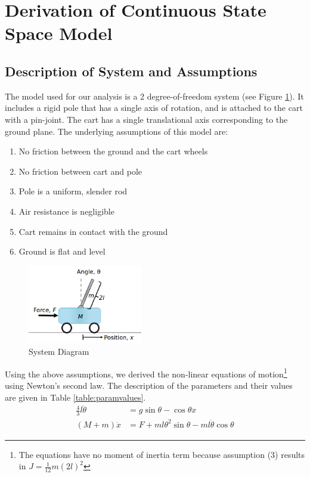 \documentclass{article}
\begin{document}
\section{Derivation of Continuous State Space Model}
\subsection{Description of System and Assumptions}
The model used for our analysis is a 2 degree-of-freedom system (see Figure \ref{fig:sys_diagram}). It includes a rigid pole that has a single axis of rotation, and is attached to the cart with a pin-joint. The cart has a single translational axis corresponding to the ground plane. The underlying assumptions of this model are:
\begin{multicols}{2}
\begin{enumerate}
\item No friction between the ground and the cart wheels
\item No friction between cart and pole
\item Pole is a uniform, slender rod
\item Air resistance is negligible
\item Cart remains in contact with the ground
\item Ground is flat and level
\end{enumerate}
\end{multicols}
\begin{figure}[h!]
 	\centering
 	\includegraphics[width=5cm,keepaspectratio]{SystemDiagram.png}
 	\caption{System Diagram}
 	\label{fig:sys_diagram}
 \end{figure}
Using the above assumptions, we derived the non-linear equations of motion\footnote{The equations have no moment of inertia term because assumption (3) results in $J=\frac{1}{12}m(2l)^2$} using Newton's second law.  The description of the parameters and their values are given in Table \ref{table:paramvalues}.
\begin{equation}
\begin{aligned}
\frac{4}{3}l \ddot{\theta} &= g \sin \theta - \cos \theta \ddot{x} \\
(M+m)\ddot{x} &= F + ml \theta^2 \sin\theta -ml\ddot{\theta}\cos\theta
\end{aligned}
\label{eq:EOM_nonlinear}
\end{equation}
\end{document}

